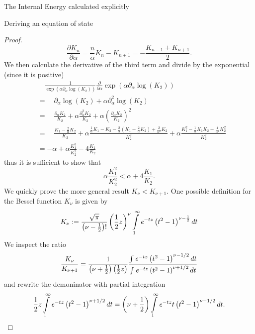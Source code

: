 \begin{section}{The Internal Energy calculated explicitly}
\begin{subsection}{Deriving an equation of state}
\begin{proof}
	\begin{equation}
		\frac{\partial K_n}{\partial\alpha} = \frac{n}{\alpha}K_n-K_{n+1} = -\frac{K_{n-1}+K_{n+1}}{2}.
		\label{2-IntEner-BesselDerivative}
	\end{equation}
	We then calculate the derivative of the third term and divide by the exponential (since it is positive)
	\begin{align}
		&\hspace{1em} \frac{1}{\exp(\alpha\partial_\alpha\log(K_2))}\frac{\partial}{\partial\alpha}\exp(\alpha\partial_\alpha\log(K_2))\\
		&= \hspace{1em} \partial_\alpha\log(K_2) + \alpha\partial^2_\alpha\log(K_2)\\
		&= \hspace{1em} \frac{\partial_\alpha K_2}{K_2} + \alpha\frac{\partial^2_\alpha K_2}{K_2} + \alpha\left(\frac{\partial_\alpha K_2}{K_2}\right)^2\\
		&= \hspace{1em} \frac{K_1-\frac{2}{\alpha}K_2}{K_2} + \alpha\frac{\frac{1}{\alpha}K_1-K_2-\frac{2}{\alpha}\left(K_1-\frac{2}{\alpha}K_2\right)+\frac{2}{\alpha^2}K_2}{K_2^2} + \alpha\frac{K_1^2-\frac{1}{\alpha}K_1K_2-\frac{4}{\alpha^2}K_2^2}{K_2^2}\\
		&= -\alpha + \alpha\frac{K_1^2}{K_2^2} - 4\frac{K_1}{K_2}
	\end{align}
	thus it is sufficient to show that
	\begin{equation}
		\alpha\frac{K_1^2}{K_2^2}  < \alpha + 4\frac{K_1}{K_2}.
	\end{equation}
	We quickly prove the more general result $K_\nu<K_{\nu+1}$. One possible definition\cite{weissteinModifiedBesselFunction} for the Bessel function $K_\nu$ is given by
	\begin{equation}
		K_\nu := \frac{\sqrt{\pi}}{\left(\nu-\frac{1}{2}\right)!}\left(\frac{1}{2}z\right)^\nu\int\limits_1^\infty\mathit{e}^{-tz}\left(t^2-1\right)^{\nu-\frac{1}{2}}dt
	\end{equation}
	We inspect the ratio
	\begin{equation}
		\frac{K_\nu}{K_{\nu+1}} = \frac{1}{\left(\nu+\frac{1}{2}\right)\left(\frac{1}{2}z\right)}\frac{\int\mathit{e}^{-tz}\left(t^2-1\right)^{\nu-1/2}dt}{\int\mathit{e}^{-tz}\left(t^2-1\right)^{\nu+1/2}dt}
	\end{equation}
	and rewrite the demoninator with partial integration
	\begin{equation}
		 \frac{1}{2}z\int\limits_1^\infty\e^{-tz}\left(t^2-1\right)^{\nu+1/2}dt = \left(\nu+\frac{1}{2}\right)\int\limits_1^\infty \e^{-tz}t\left(t^2-1\right)^{\nu-1/2}dt.

\end{equation}
\end{proof}
\end{subsection}
\end{section}
